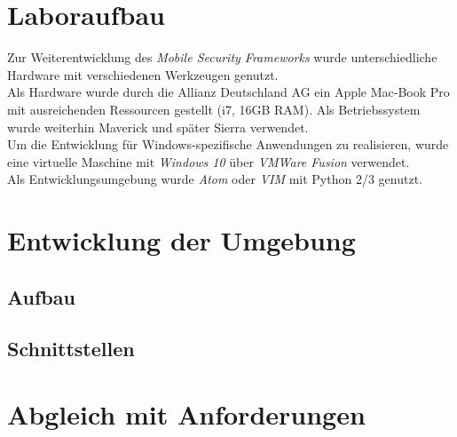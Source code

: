\section{Laboraufbau}
Zur Weiterentwicklung des \textit{Mobile Security Frameworks} wurde unterschiedliche Hardware mit verschiedenen Werkzeugen genutzt.\\

Als Hardware wurde durch die Allianz Deutschland AG ein Apple Mac-Book Pro mit ausreichenden Ressourcen gestellt (i7, 16GB RAM). Als Betriebssystem wurde weiterhin Maverick und später Sierra verwendet.\\

Um die Entwicklung für Windows-spezifische Anwendungen zu realisieren, wurde eine virtuelle Maschine mit \textit{Windows  10} über \textit{VMWare Fusion} verwendet.\\

Als Entwicklungsumgebung wurde \textit{Atom} oder \textit{VIM} mit Python 2/3 genutzt.
\section{Entwicklung der Umgebung}
	\subsection{Aufbau}
	\subsection{Schnittstellen}

		

  
\section{Abgleich mit Anforderungen}